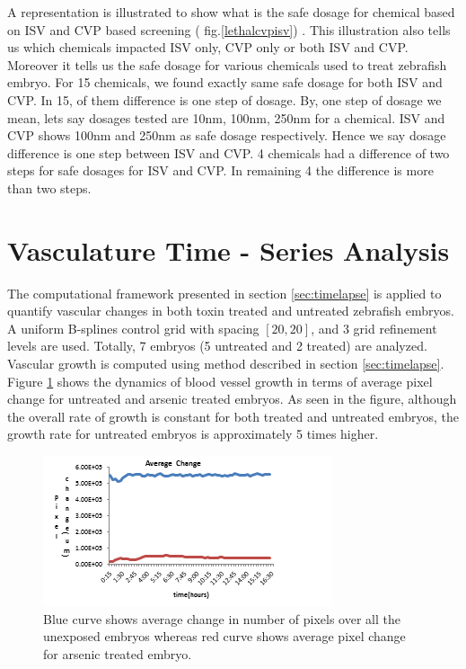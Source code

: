 A representation is illustrated to show what is the safe dosage for chemical based on ISV and CVP based screening ( fig.\ref{lethalcvpisv}) . This illustration also tells us which chemicals impacted ISV only, CVP only or both ISV and CVP. Moreover it tells us the safe dosage for various chemicals used to treat zebrafish embryo. For 15 chemicals, we found exactly same safe dosage for both ISV and CVP. In 15, of them difference is one step of dosage. By, one step of dosage we mean, lets say dosages tested are 10nm, 100nm, 250nm for a chemical. ISV and CVP shows 100nm and 250nm as safe dosage respectively. Hence we say dosage difference is one step between ISV and CVP. 4 chemicals had a difference of two steps for safe dosages for ISV and CVP. In remaining 4 the difference is more than two steps.

\section{Vasculature Time - Series Analysis}
The computational framework presented in section \ref{sec:timelapse} is applied to quantify vascular changes in both toxin treated and untreated zebrafish embryos. A uniform B-splines control grid with spacing $[20, 20]$, and 3 grid refinement levels are used. Totally, 7 embryos (5 untreated and 2 treated) are analyzed. Vascular growth is computed using method described in section \ref{sec:timelapse}. Figure \ref{toxicityAvgAs} shows the dynamics of blood vessel growth in terms of average pixel change for untreated and arsenic treated embryos. As seen in the figure, although the overall rate of growth is constant for both treated and untreated embryos, the growth rate for untreated embryos is approximately 5 times higher.  

\begin{figure}[!p]
  \begin{center}
    \includegraphics[scale=1]{figure/AvgAs.png}
  \end{center}
  \caption[Average comparison between healthy and treated]{Blue curve shows average change in number of pixels over all the unexposed embryos whereas red curve shows average pixel change for arsenic treated embryo.}
  \label{toxicityAvgAs}
\end{figure}

